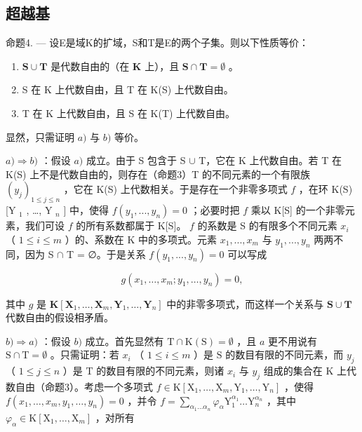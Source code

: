 \subsection{超越基}

命题4. --- 设E是域K的扩域，S和T是E的两个子集。则以下性质等价：

\begin{enumerate}
\def\labelenumi{\alph{enumi})}
\item
  \(\mathbf{S} \cup \mathbf{T}\) 是代数自由的（在 \(\mathbf{K}\) 上），且 \(\mathbf{S} \cap \mathbf{T} = \emptyset\) 。
\item
  S 在 K 上代数自由，且 T 在 K(S) 上代数自由。
\item
  T 在 K 上代数自由，且 S 在 K(T) 上代数自由。
\end{enumerate}

显然，只需证明 \(a)\) 与 \(b)\) 等价。

\(a) \Rightarrow b)\) ：假设 \(a)\) 成立。由于 S 包含于 S \(\cup\) T，它在 K 上代数自由。若 T 在 K(S) 上不是代数自由的，则存在（命题3）T 的不同元素的一个有限族 \((y_j)_{1 \leq j \leq n}\) ，它在 K(S) 上代数相关。于是存在一个非零多项式 \(f\) ，在环 K(S) {[}Y \(_1\) , \ldots, Y \(_n\) {]} 中，使得 \(f(y_1, ..., y_n) = 0\) ；必要时把 \(f\) 乘以 K{[}S{]} 的一个非零元素，我们可设 \(f\) 的所有系数都属于 K{[}S{]}。 \(f\) 的系数是 S 的有限多个不同元素 \(x_i\) （ \(1 \leq i \leq m\) ）的、系数在 K 中的多项式。元素 \(x_1, ..., x_m\) 与 \(y_1, ..., y_n\) 两两不同，因为 S \(\cap\) T = ∅。于是关系 \(f(y_1, ..., y_n) = 0\) 可以写成

\[
g \left(x _ {1}, \dots , x _ {m}; y _ {1}, \dots , y _ {n}\right) = 0,
\]

其中 \(g\) 是 \(\mathbf{K}[\mathbf{X}_1, \ldots, \mathbf{X}_m, \mathbf{Y}_1, \ldots, \mathbf{Y}_n]\) 中的非零多项式，而这样一个关系与 \(\mathbf{S} \cup \mathbf{T}\) 代数自由的假设相矛盾。

\(b) \Rightarrow a)\) ：假设 \(b)\) 成立。首先显然有 \(\mathrm{T} \cap \mathrm{K}(\mathrm{S}) = \emptyset\) ，且 \(a\) 更不用说有 \(\mathrm{S} \cap \mathrm{T} = \emptyset\) 。只需证明：若 \(x_i\) （ \(1 \leqslant i \leqslant m\) ）是 \(\mathrm{S}\) 的数目有限的不同元素，而 \(y_j\) （ \(1 \leqslant j \leqslant n\) ）是 \(\mathrm{T}\) 的数目有限的不同元素，则诸 \(x_i\) 与 \(y_j\) 组成的集合在 \(\mathrm{K}\) 上代数自由（命题3）。考虑一个多项式 \(f \in \mathrm{K}[\mathrm{X}_1, \ldots, \mathrm{X}_m, \mathrm{Y}_1, \ldots, \mathrm{Y}_n]\) ，使得 \(f(x_1, \ldots, x_m, y_1, \ldots, y_n) = 0\) ，并令 \(f = \sum_{\alpha_1 \ldots \alpha_n} \varphi_\alpha \mathrm{Y}_1^{\alpha_1} \ldots \mathrm{Y}_n^{\alpha_n}\) ，其中 \(\varphi_\alpha \in \mathrm{K}[\mathrm{X}_1, \ldots, \mathrm{X}_m]\) ，对所有

